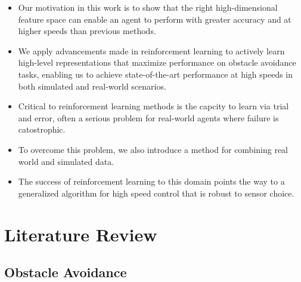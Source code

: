 \documentclass[paper=a4, fontsize=11pt]{scrartcl} %
\begin{document}
\begin{itemize}	
	\item Our motivation in this work is to show that the right high-dimensional feature space can enable an agent to perform with greater accuracy and at higher speeds than previous methods.
	\item We apply advancements made in reinforcement learning to actively learn high-level representations that maximize performance on obstacle avoidance tasks, enabling us to achieve state-of-the-art performance at high speeds in both simulated and real-world scenarios. 
\end{itemize}

\begin{itemize}
	\item Critical to reinforcement learning methods is the capcity to learn via trial and error, often a serious problem for real-world agents where failure is catostrophic.
	\item To overcome this problem, we also introduce a method for combining real world and simulated data.
	\item The success of reinforcement learning to this domain points the way to a generalized algorithm for high speed control that is robust to sensor choice.
\end{itemize}

\section{Literature Review}

	\subsection{Obstacle Avoidance}
\end{document}
